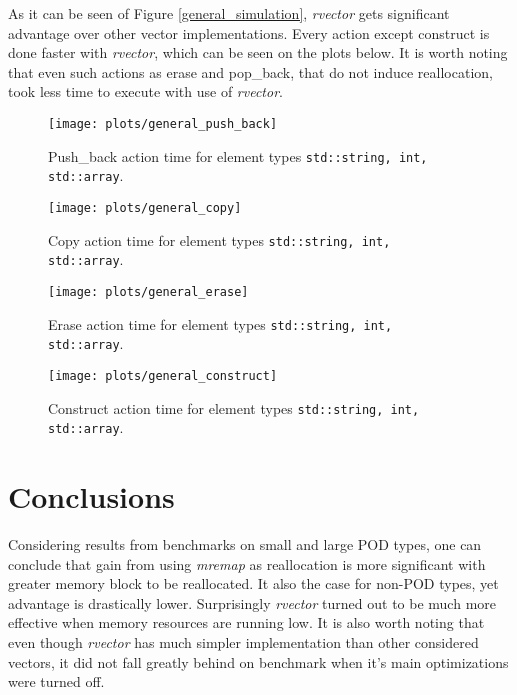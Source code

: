 \documentclass[inz, english, shortabstract]{iithesis}
\begin{document}
As it can be seen of Figure \ref{general_simulation}, {\it rvector} gets significant advantage over other vector implementations. Every action except construct is done faster with {\it rvector}, which can be seen on the plots below. It is worth noting that even such actions as erase and pop\_back, that do not induce reallocation, took less time to execute with use of {\it rvector}. 

\begin{figure}[h!]
\label{general_push_back}
\texttt{[image: plots/general\_push\_back]}
\caption{Push\_back action time for element types \lstinline{std::string, int, std::array}.}
\end{figure}

\begin{figure}[h!]
\label{general_copy}
\texttt{[image: plots/general\_copy]}
\caption{Copy action time for element types \lstinline{std::string, int, std::array}.}
\end{figure}

\begin{figure}[h!]
\label{general_erase}
\texttt{[image: plots/general\_erase]}
\caption{Erase action time for element types \lstinline{std::string, int, std::array}.}
\end{figure}

\begin{figure}[h!]
\label{general_construct}
\texttt{[image: plots/general\_construct]}
\caption{Construct action time for element types \lstinline{std::string, int, std::array}.}
\end{figure}

\chapter{Conclusions}
Considering results from benchmarks on small and large POD types, one can conclude that gain from using {\it mremap} as reallocation is more significant with greater memory block to be reallocated. It also the case for non-POD types, yet advantage is drastically lower. Surprisingly {\it rvector} turned out to be much more effective when memory resources are running low. It is also worth noting that even though {\it rvector} has much simpler implementation than other considered vectors, it did not fall greatly behind on benchmark when it's main optimizations were turned off.
\end{document}
